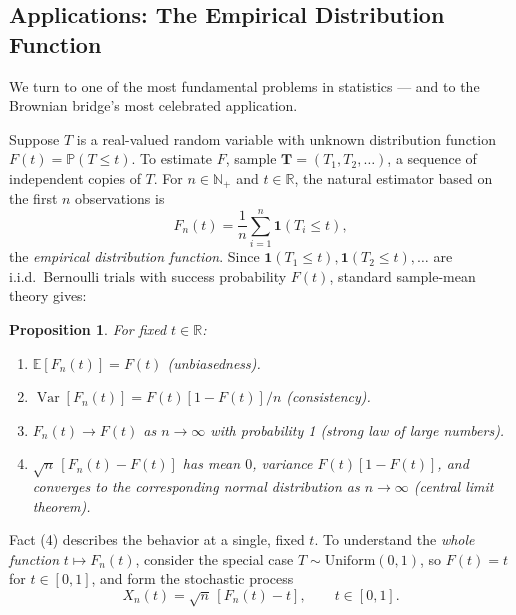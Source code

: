 \documentclass[12pt,openany]{book}
\newtheorem{proposition}[theorem]{Proposition}
\theoremstyle{definition}
\theoremstyle{remark}
\newcommand{\R}{\mathbb{R}}
\newcommand{\N}{\mathbb{N}}
\newcommand{\E}{\mathbb{E}}
\newcommand{\Prob}{\mathbb{P}}
\newcommand{\ii}{\mathbf{1}}
\DeclareMathOperator{\Var}{Var}
\begin{document}
\subsection{Applications: The Empirical Distribution Function}
 
We turn to one of the most fundamental problems in statistics — and to the Brownian bridge's most celebrated application.
 
Suppose $T$ is a real-valued random variable with unknown distribution function $F(t) = \Prob(T\le t)$. To estimate $F$, sample $\mathbf T = (T_1,T_2,\dots)$, a sequence of independent copies of $T$. For $n\in\N_+$ and $t\in\R$, the natural estimator based on the first $n$ observations is
\begin{equation}
    F_n(t) = \frac1n\sum_{i=1}^n \ii(T_i\le t), \tag{18.3.12}
\end{equation}
the \emph{empirical distribution function}. Since $\ii(T_1\le t), \ii(T_2\le t), \dots$ are i.i.d.\ Bernoulli trials with success probability $F(t)$, standard sample-mean theory gives:
 
\begin{proposition}
For fixed $t\in\R$:
\begin{enumerate}[label=(\arabic*)]
    \item $\E[F_n(t)] = F(t)$ (unbiasedness).
    \item $\Var[F_n(t)] = F(t)[1-F(t)]/n$ (consistency).
    \item $F_n(t) \to F(t)$ as $n\to\infty$ with probability 1 (strong law of large numbers).
    \item $\sqrt n\,[F_n(t)-F(t)]$ has mean $0$, variance $F(t)[1-F(t)]$, and converges to the corresponding normal distribution as $n\to\infty$ (central limit theorem).
\end{enumerate}
\end{proposition}
 
Fact (4) describes the behavior at a single, fixed $t$. To understand the \emph{whole function} $t\mapsto F_n(t)$, consider the special case $T \sim \mathrm{Uniform}(0,1)$, so $F(t)=t$ for $t\in[0,1]$, and form the stochastic process
\begin{equation}
    X_n(t) = \sqrt n\,[F_n(t)-t], \qquad t\in[0,1]. \tag{18.3.13}
\end{equation}
 
\end{document}
